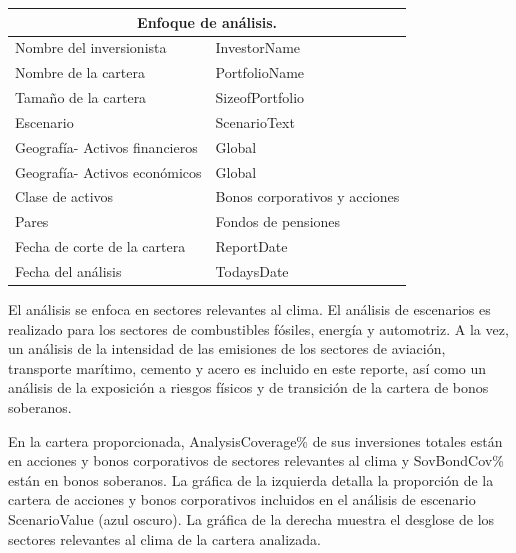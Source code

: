 \documentclass[10pt,table]{article}\usepackage[]{graphicx}\usepackage[]{color}
\begin{document}
\begin{multicols}{2}
		\begin{center}
			{
				\setlength{\tabcolsep}{10pt} %
				\renewcommand{\arraystretch}{1.5} %
				\begin{tabular}{ p{.35\linewidth} p{.49\linewidth} }
					\hline
					\multicolumn{2}{c}{\textbf{Enfoque de análisis.}} \\
					\hline
					Nombre del inversionista & InvestorName \\ 
					Nombre de la cartera & PortfolioName \\ 
					Tamaño de la cartera & SizeofPortfolio \\ 
					Escenario & ScenarioText \\ 
					Geografía- \newline Activos financieros & Global \\ 
					Geografía- \newline Activos económicos & Global \\ 
					Clase de activos & Bonos corporativos y acciones \\ 
					Pares & Fondos de pensiones \\
					Fecha de corte de la cartera & ReportDate \\ 
					Fecha del análisis & TodaysDate \\ 
					\hline
				\end{tabular}
			}
			
		\end{center}
		
		El análisis se enfoca en sectores relevantes al clima. El análisis de escenarios es realizado para los sectores de combustibles fósiles, energía y automotriz. A la vez, un análisis de la intensidad de las emisiones de los sectores de aviación, transporte marítimo, cemento y acero es incluido en este reporte, así como un análisis de la exposición a riesgos físicos y de transición de la cartera de bonos soberanos. 
		
		En la cartera proporcionada, AnalysisCoverage\% de sus inversiones totales están en acciones y bonos corporativos de sectores relevantes al clima y SovBondCov\% están en bonos soberanos. La gráfica de la izquierda detalla la proporción de la cartera de acciones y bonos corporativos incluidos en el análisis de escenario ScenarioValue (azul oscuro). La gráfica de la derecha muestra el desglose de los sectores relevantes al clima de la cartera analizada.
		
		
		
		
		\vspace{0.8cm}
		
		
	\end{multicols}	
	
\end{document}
